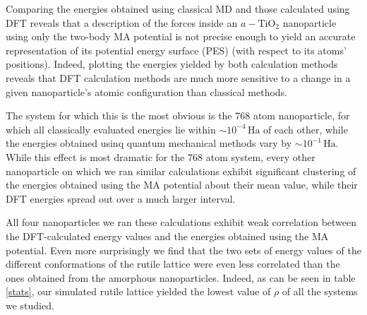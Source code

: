 \documentclass[aps,prb,twocolumn,amsmath,amssymb,superscriptaddress,longbibliography]{revtex4-1}
\newcommand\tab[1][1cm]{\hspace*{#1}} %
\begin{document}
\tab Comparing the energies obtained using classical MD and those calculated using DFT reveals that a description of the forces inside an $a-\text{TiO}_2$ nanoparticle using only the two-body MA potential is not precise enough to yield an accurate representation of its potential energy surface (PES) (with respect to its atoms' positions).
Indeed, plotting the energies yielded by both calculation methods reveals that DFT calculation methods are much more sensitive to a change in a given nanoparticle's atomic configuration than classical methods.

\tab The system for which this is the most obvious is the 768 atom nanoparticle, for which all classically evaluated energies lie within $\sim 10^{-4}\,\text{Ha}$ of each other, while the energies obtained usinq quantum mechanical methods vary by $\sim 10^{-1}\,\text{Ha}$.
While this effect is most dramatic for the 768 atom system, every other nanoparticle on which we ran similar calculations exhibit significant clustering of the energies obtained using the MA potential about their mean value, while their DFT energies spread out over a much larger interval.
    
\tab All four nanoparticles we ran these calculations exhibit weak correlation between the DFT-calculated energy values and the energies obtained using the MA potential. 
Even more surprisingly we find that the two sets of energy values of the different conformations of the rutile lattice were even less correlated than the ones obtained from the amorphous nanoparticles. 
Indeed, as can be seen in table \ref{stats}, our simulated rutile lattice yielded the lowest value of $\rho$ of all the systems we studied.
\end{document}
